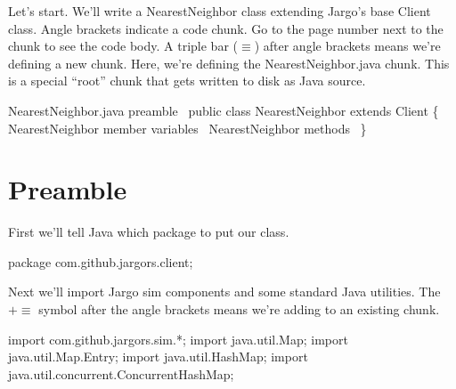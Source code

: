 Let's start. We'll write a {\Tt{}NearestNeighbor\nwendquote} class extending Jargo's base
{\Tt{}Client\nwendquote} class. Angle brackets indicate a code chunk. Go to the page number
next to the chunk to see the code body. A triple bar ($\equiv$) after angle
brackets means we're defining a new chunk. Here, we're defining the
NearestNeighbor.java chunk. This is a special ``root'' chunk that gets written
to disk as Java source.

\nwenddocs{}\endmoddef\nwstartdeflinemarkup\nwenddeflinemarkup
\LA{}NearestNeighbor.java preamble~{\nwtagstyle{}}\RA{}
public class NearestNeighbor extends Client \{
  \LA{}\code{}NearestNeighbor\edoc{} member variables~{\nwtagstyle{}}\RA{}
  \LA{}\code{}NearestNeighbor\edoc{} methods~{\nwtagstyle{}}\RA{}
\}
\nwendcode{}\nwdocspar

\section{Preamble}
\label{NearestNeighbor: preamble}


First we'll tell Java which package to put our class.

\nwenddocs{}\endmoddef\nwstartdeflinemarkup{}\nwenddeflinemarkup
package com.github.jargors.client;
\nwendcode{}\nwdocspar

Next we'll import Jargo {\Tt{}sim\nwendquote} components and some standard Java utilities.
The $+\equiv$ symbol after the angle brackets means we're adding to an existing
chunk.

\nwenddocs{}\plusendmoddef\nwstartdeflinemarkup{}\nwenddeflinemarkup
import com.github.jargors.sim.*;
import java.util.Map;
import java.util.Map.Entry;
import java.util.HashMap;
import java.util.concurrent.ConcurrentHashMap;
\nwendcode{}\nwdocspar

